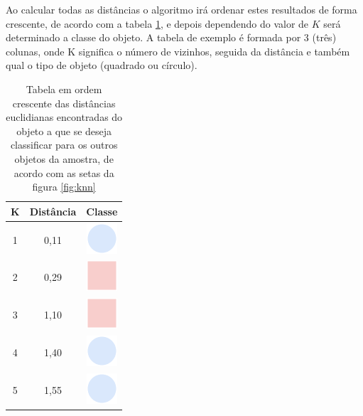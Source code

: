 Ao calcular todas as distâncias o algoritmo irá ordenar estes resultados de forma crescente, de acordo com a tabela \ref{tab:exemploKNN}, e depois dependendo do valor de ${K}$ será determinado a classe do objeto. A tabela de exemplo é formada por 3 (três) colunas, onde K significa o número de vizinhos, seguida da distância e também qual o tipo de objeto (quadrado ou círculo).

\begin{table}[!ht]
\centering 
\begin{tabular}{|c|c|c|}
\hline \hline 
\rowcolor[HTML]{EFEFEF} 
K & Distância     & Classe \\ \hline
1 & 0,11       & \includegraphics[scale=0.2]{figs/circulo.png}       \\ \hline                    
2 & 0,29       &  \includegraphics[scale=0.2]{figs/quadrado.png}        \\ \hline
3 & 1,10       &  \includegraphics[scale=0.2]{figs/quadrado.png}   \\ \hline                    
4 & 1,40       &  \includegraphics[scale=0.2]{figs/circulo.png}     \\ \hline
5 & 1,55       &  \includegraphics[scale=0.2]{figs/circulo.png}     \\ \hline                    
\end{tabular}
\caption{Tabela em ordem crescente das distâncias euclidianas encontradas do objeto a que se deseja classificar para os outros objetos da amostra, de acordo com as setas da figura \ref{fig:knn}}
\label{tab:exemploKNN}
\end{table}

